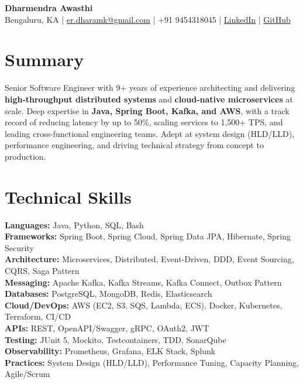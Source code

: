 \documentclass[11pt,a4paper]{article}
\begin{document}
\begin{center}
{\LARGE \textbf{Dharmendra Awasthi}}\\[3pt]
Bengaluru, KA \;|\; \href{mailto:er.dharamk@gmail.com}{er.dharamk@gmail.com} \;|\; +91 9454318045 \;|\;
\href{https://www.linkedin.com/in/dharamcodes/}{LinkedIn} \;|\;
\href{https://github.com/dharamcodes}{GitHub}
\end{center}

\section{Summary}
Senior Software Engineer with 9+ years of experience architecting and delivering \textbf{high-throughput distributed systems} and \textbf{cloud-native microservices} at scale. Deep expertise in \textbf{Java, Spring Boot, Kafka, and AWS}, with a track record of reducing latency by up to 50\%, scaling services to 1,500+ TPS, and leading cross-functional engineering teams. Adept at system design (HLD/LLD), performance engineering, and driving technical strategy from concept to production.

\section{Technical Skills}
\textbf{Languages:} Java, Python, SQL, Bash \\
\textbf{Frameworks:} Spring Boot, Spring Cloud, Spring Data JPA, Hibernate, Spring Security \\
\textbf{Architecture:} Microservices, Distributed, Event-Driven, DDD, Event Sourcing, CQRS, Saga Pattern \\
\textbf{Messaging:} Apache Kafka, Kafka Streams, Kafka Connect, Outbox Pattern \\
\textbf{Databases:} PostgreSQL, MongoDB, Redis, Elasticsearch \\
\textbf{Cloud/DevOps:} AWS (EC2, S3, SQS, Lambda, ECS), Docker, Kubernetes, Terraform, CI/CD \\
\textbf{APIs:} REST, OpenAPI/Swagger, gRPC, OAuth2, JWT \\
\textbf{Testing:} JUnit 5, Mockito, Testcontainers, TDD, SonarQube \\
\textbf{Observability:} Prometheus, Grafana, ELK Stack, Splunk \\
\textbf{Practices:} System Design (HLD/LLD), Performance Tuning, Capacity Planning, Agile/Scrum
\end{document}
